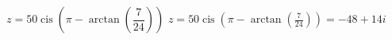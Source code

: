 { $z = 50\operatorname{cis}\left(\pi-\arctan\left(\dfrac{7}{24}\right)\right)$ }
{ $z = 50\operatorname{cis}\left(\pi-\arctan\left(\frac{7}{24}\right)\right) = -48 + 14i$ }
